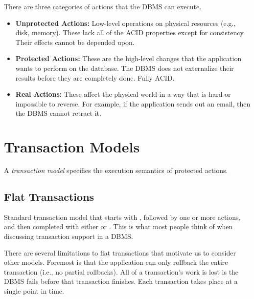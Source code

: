 \documentclass[11pt]{article}
\begin{document}
There are three categories of actions that the DBMS can execute.
\begin{itemize}
    \item \textbf{Unprotected Actions: }
    Low-level operations on physical resources (e.g., disk, memory). These lack all of the ACID 
    properties except for consistency. Their effects cannot be depended upon.
    
    \item \textbf{Protected Actions: }
    These are the high-level changes that the application wants to perform on the database.
    The DBMS does not externalize their results before they are completely done. Fully ACID.
    
    \item \textbf{Real Actions: }
    These affect the physical world in a way that is hard or impossible to reverse.
    For example, if the application sends out an email, then the DBMS cannot retract it.
\end{itemize}

\section{Transaction Models}
A \textit{transaction model} specifies the execution semantics of protected actions.

\subsection*{Flat Transactions}
Standard transaction model that starts with , followed by one or more actions, and then 
completed with either  or .
This is what most people think of when discussing transaction support in a DBMS.

There are several limitations to flat transactions that motivate us to consider other models.
Foremost is that the application can only rollback the entire transaction (i.e., no partial 
rollbacks).
All of a transaction's work is lost is the DBMS fails before that transaction finishes. Each 
transaction takes place at a single point in time.


\end{document}
